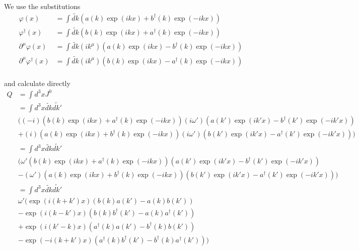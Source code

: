 \documentclass[fontsize=11pt]{scrartcl} %
\numberwithin{equation}{section} %
\numberwithin{figure}{section} %
\numberwithin{table}{section} %
\begin{document}
We use the substitutions
\[
    \begin{aligned}
        \varphi(x) &= \int \tilde{dk}\left( a(k)\exp(ikx) +
        b^{\dagger}(k)\exp(-ikx) \right)\\
        \varphi^{\dagger}(x) &= \int\tilde{dk}\left( b(k)\exp(ikx) +
        a^{\dagger}(k)\exp(-ikx) \right)\\
        \partial^{\mu}\varphi(x) &= \int \tilde{dk}(ik^{\mu})\left(
            a(k)\exp(ikx) - b^{\dagger}(k)\exp(-ikx) \right)\\
            \partial^{\mu}\varphi^{\dagger}(x) &= \int\tilde{dk}(ik^{\mu})
            \left( b(k)\exp(ikx) - a^{\dagger}(k)\exp(-ikx) \right)\\
    \end{aligned}
\]

and calculate directly
\[
    \begin{aligned}
        Q &= \int d^3x J^0\\
        &= \int d^3x\tilde{dk}\tilde{dk'}\\
        &(
            (-i)(b(k)\exp(ikx) + a^{\dagger}(k)\exp(-ikx))
            (i\omega')(a(k')\exp(ik'x) - b^{\dagger}(k')\exp(-ik'x))\\
            &+(i)(a(k)\exp(ikx) + b^{\dagger}(k)\exp(-ikx))
            (i\omega')(b(k')\exp(ik'x) - a^{\dagger}(k')\exp(-ik'x))
        )\\
        &= \int d^3x\tilde{dk}\tilde{dk'}\\
        &(
            \omega'(b(k)\exp(ikx) + a^{\dagger}(k)\exp(-ikx))
            (a(k')\exp(ik'x) - b^{\dagger}(k')\exp(-ik'x))\\
            &-(\omega')(a(k)\exp(ikx) + b^{\dagger}(k)\exp(-ikx))
            (b(k')\exp(ik'x) - a^{\dagger}(k')\exp(-ik'x))
        )\\
        &= \int d^3x\tilde{dk}\tilde{dk'}\\
        &\omega'(
            \exp(i(k+k')x)(b(k)a(k') - a(k)b(k'))\\
            &-\exp(i(k-k')x)(b(k)b^{\dagger}(k') - a(k)a^{\dagger}(k'))\\
            &+\exp(i(k'-k)x)(a^{\dagger}(k)a(k') - b^{\dagger}(k)b(k'))\\
            &-\exp(-i(k+k')x)(a^{\dagger}(k)b^{\dagger}(k') -
            b^{\dagger}(k)a^{\dagger}(k'))
        )
    \end{aligned}
\]
\end{document}
